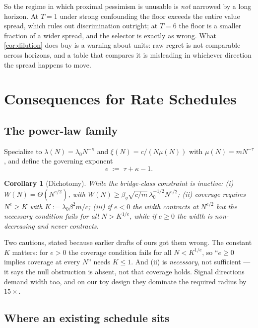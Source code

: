 \documentclass{article}
\theoremstyle{plain}
\newtheorem{corollary}[proposition]{Corollary}
\theoremstyle{definition}
\begin{document}
So the regime in which proximal pessimism is unusable is \emph{not} narrowed by a
long horizon. At $T=1$ under strong confounding the floor exceeds the entire
value spread, which rules out discrimination outright; at $T=6$ the floor is a
smaller fraction of a wider spread, and the selector is exactly as wrong. What
\cref{cor:dilution} does buy is a warning about units: raw regret is not
comparable across horizons, and a table that compares it is misleading in
whichever direction the spread happens to move.

\section{Consequences for Rate Schedules}
\label{sec:placement}

\subsection{The power-law family}

Specialize to $\lambda(N) = \lambda_0 N^{-\kappa}$ and $\xi(N) = c/(N\mu(N))$
with $\mu(N) = m N^{-\tau}$, and define the governing exponent
\begin{equation}
e \;:=\; \tau + \kappa - 1 .
\label{eq:e}
\end{equation}

\begin{corollary}[Dichotomy]
\label{cor:dichotomy}
While the bridge-class constraint is inactive:
\emph{(i)} $W(N) = \Theta(N^{e/2})$, with
$W(N) \ge \beta_g \sqrt{c/m}\,\lambda_0^{-1/2} N^{e/2}$;
\emph{(ii)} coverage \emph{requires} $N^{e} \ge K$ with
$K := \lambda_0\beta^2 m/c$;
\emph{(iii)} if $e<0$ the width contracts at $N^{e/2}$ but the necessary
condition fails for all $N > K^{1/e}$, while if $e \ge 0$ the width is
non-decreasing and never contracts.
\end{corollary}

Two cautions, stated because earlier drafts of ours got them wrong. The constant
$K$ matters: for $e>0$ the coverage condition fails for all $N<K^{1/e}$, so
``$e\ge0$ implies coverage at every $N$'' needs $K\le1$. And (ii) is
\emph{necessary}, not sufficient --- it says the null obstruction is absent, not
that coverage holds. Signal directions demand width too, and on our toy design
they dominate the required radius by $15\times$.

\subsection{Where an existing schedule sits}
\label{sec:e-paper}
\end{document}

